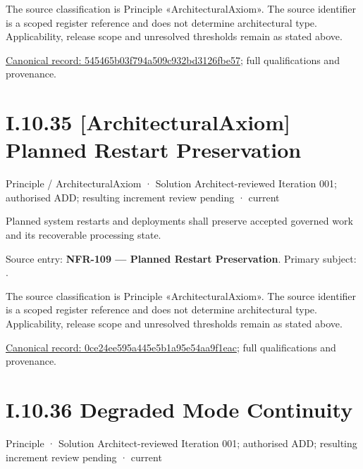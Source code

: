 The source classification is Principle «ArchitecturalAxiom». The source identifier is a scoped register reference and does not determine architectural type. Applicability, release scope and unresolved thresholds remain as stated above.


{\footnotesize \href{../../../../continuum/motivation/principle/architectural-axiom/545465b03f794a509c932bd3126fbe57.md}{Canonical record: 545465b03f794a509c932bd3126fbe57}; full qualifications and provenance.}\par
\section*{I.10.35 [ArchitecturalAxiom] Planned Restart Preservation}
\label{navigation:I.10.35}

\label{element:0ce24ee595a445e5b1a95e54aa9f1eac}
{\small Principle / ArchitecturalAxiom · Solution Architect-reviewed Iteration 001; authorised ADD; resulting increment review pending · current}\par

Planned system restarts and deployments shall preserve accepted governed work and its recoverable processing state.



Source entry: \textbf{NFR-109 — Planned Restart Preservation}. Primary subject: \texttt{}.



The source classification is Principle «ArchitecturalAxiom». The source identifier is a scoped register reference and does not determine architectural type. Applicability, release scope and unresolved thresholds remain as stated above.


{\footnotesize \href{../../../../continuum/motivation/principle/architectural-axiom/0ce24ee595a445e5b1a95e54aa9f1eac.md}{Canonical record: 0ce24ee595a445e5b1a95e54aa9f1eac}; full qualifications and provenance.}\par
\section*{I.10.36 Degraded Mode Continuity}
\label{navigation:I.10.36}

\label{element:51191ca802f54efb8554d20423199cd0}
{\small Principle · Solution Architect-reviewed Iteration 001; authorised ADD; resulting increment review pending · current}\par

